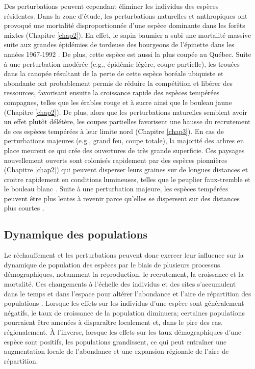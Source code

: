 Des perturbations peuvent cependant éliminer les individus des espèces
résidentes. Dans la zone d'étude, les perturbations naturelles et
anthropiques ont provoqué une mortalité disproportionnée d'une espèce
dominante dans les forêts mixtes (Chapitre \ref{chap2}). En effet, le
sapin baumier a subi une mortalité massive suite aux grandes épidémies
de tordeuse des bourgeons de l'épinette dans les années 1967-1992
\citep{duchesne_population_2008}. De plus, cette espèce est aussi la
plus coupée au Québec. Suite à une perturbation modérée (e.g., épidémie
légère, coupe partielle), les trouées dans la canopée résultant de la
perte de cette espèce boréale ubiquiste et abondante ont probablement
permis de réduire la compétition et libérer des ressources, favorisant
ensuite la croissance rapide des espèces tempérées compagnes, telles que
les érables rouge et à sucre ainsi que le bouleau jaune (Chapitre
\ref{chap2}). De plus, alors que les perturbations naturelles semblent
avoir un effet plutôt délétère, les coupes partielles favorisent une
hausse du recrutement de ces espèces tempérées à leur limite nord
(Chapitre \ref{chap3}). En cas de perturbations majeures (e.g., grand
feu, coupe totale), la majorité des arbres en place meurent ce qui crée
des ouvertures de très grande superficie. Ces paysages nouvellement
ouverts sont colonisés rapidement par des espèces pionnières (Chapitre
\ref{chap2}) qui peuvent disperser leurs graines sur de longues
distances et croitre rapidement en conditions lumineuses, telles que le
peuplier faux-tremble et le bouleau blanc
\citep{boucher_fire_2017, grondin_have_2018}. Suite à une perturbation
majeure, les espèces tempérées peuvent être plus lentes à revenir parce
qu'elles se dispersent sur des distances plus courtes
\citep{scheller_spatially_2005}.

\hypertarget{dynamique-des-populations}{%
\subsection{Dynamique des populations}\label{dynamique-des-populations}}

Le réchauffement et les perturbations peuvent donc exercer leur
influence sur la dynamique de population des espèces par le biais de
plusieurs processus démographiques, notamment la reproduction, le
recrutement, la croissance et la mortalité. Ces changements à l'échelle
des individus et des sites s'accumulent dans le temps et dans l'espace
pour altérer l'abondance et l'aire de répartition des populations
\citep{holt_theoretical_2005}. Lorsque les effets sur les individus
d'une espèce sont généralement négatifs, le taux de croissance de la
population diminuera; certaines populations pourraient être amenées à
disparaître localement et, dans le pire des cas, régionalement. À
l'inverse, lorsque les effets sur les taux démographiques d'une espèce
sont positifs, les populations grandissent, ce qui peut entraîner une
augmentation locale de l'abondance et une expansion régionale de l'aire
de répartition.

